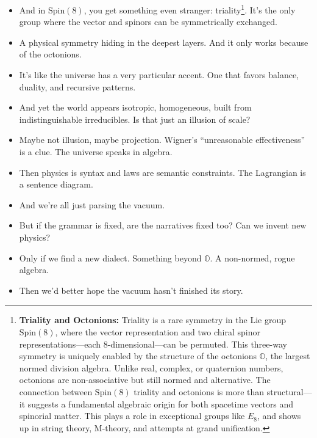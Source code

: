 \begin{itemize}
  \item[\textbf{Nina:}] And in \(\mathrm{Spin}(8)\), you get something even stranger: triality\footnote{
  \textbf{Triality and Octonions:} Triality is a rare symmetry in the Lie group \(\mathrm{Spin}(8)\), where the vector representation and two chiral spinor representations—each 8-dimensional—can be permuted. This three-way symmetry is uniquely enabled by the structure of the octonions \(\mathbb{O}\), the largest normed division algebra. Unlike real, complex, or quaternion numbers, octonions are non-associative but still normed and alternative. The connection between \(\mathrm{Spin}(8)\) triality and octonions is more than structural—it suggests a fundamental algebraic origin for both spacetime vectors and spinorial matter. This plays a role in exceptional groups like \(E_8\), and shows up in string theory, M-theory, and attempts at grand unification.}.
  It’s the only group where the vector and spinors can be symmetrically exchanged.

  \item[\textbf{Ernest:}] A physical symmetry hiding in the deepest layers. And it only works because of the octonions.

  \item[\textbf{Nina:}] It’s like the universe has a very particular accent. One that favors balance, duality, and recursive patterns.

  \item[\textbf{Ernest:}] And yet the world appears isotropic, homogeneous, built from indistinguishable irreducibles. Is that just an illusion of scale?

  \item[\textbf{Nina:}] Maybe not illusion, maybe projection. Wigner’s “unreasonable effectiveness” is a clue. The universe speaks in algebra.

  \item[\textbf{Ernest:}] Then physics is syntax and laws are semantic constraints. The Lagrangian is a sentence diagram.

  \item[\textbf{Nina:}] And we're all just parsing the vacuum.

  \item[\textbf{Ernest:}] But if the grammar is fixed, are the narratives fixed too? Can we invent new physics?

  \item[\textbf{Nina:}] Only if we find a new dialect. Something beyond \(\mathbb{O}\). A non-normed, rogue algebra.

  \item[\textbf{Ernest:}] Then we’d better hope the vacuum hasn’t finished its story.
\end{itemize}


